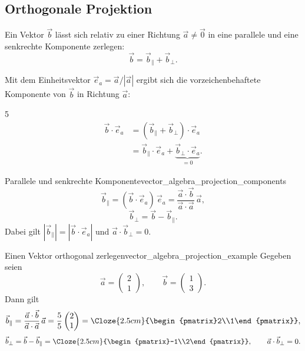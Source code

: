 \subsection{Orthogonale Projektion}
\label{subsec:vector_algebra_orthogonal_projection}

Ein Vektor $\vec b$ lässt sich relativ zu einer Richtung $\vec a\ne\vec 0$
in eine parallele und eine senkrechte Komponente zerlegen:
\[
  \boxed{\vec b=\vec b_{\parallel}+\vec b_{\perp}}.
\]

\begin{center}
\end{center}

Mit dem Einheitsvektor $\vec e_a=\vec a/|\vec a|$ ergibt sich die
vorzeichenbehaftete Komponente von $\vec b$ in Richtung $\vec a$:
\begin{ClozeArea}[34]{5}
  \[
    \begin{aligned}
      \vec b\cdot\vec e_a
      &=(\vec b_{\parallel}+\vec b_{\perp})\cdot\vec e_a\\[0.5em]
      &=\vec b_{\parallel}\cdot\vec e_a
        +\underbrace{\vec b_{\perp}\cdot\vec e_a}_{=0}.
    \end{aligned}
  \]
\end{ClozeArea}

\begin{KeyPointBox}{Parallele und senkrechte Komponente}{vector_algebra_projection_components}
  \[
    \boxed{
      \vec b_{\parallel}
      =(\vec b\cdot\vec e_a)\,\vec e_a
      =\frac{\vec a\cdot\vec b}{\vec a\cdot\vec a}\,\vec a
    },
  \]
  \[
    \boxed{
      \vec b_{\perp}
      =\vec b-\vec b_{\parallel}
    }.
  \]
  Dabei gilt $|\vec b_{\parallel}|=|\vec b\cdot\vec e_a|$ und
  $\vec a\cdot\vec b_{\perp}=0$.
\end{KeyPointBox}

\begin{ExampleBox}{Einen Vektor orthogonal zerlegen}{vector_algebra_projection_example}
  Gegeben seien
  \[
    \vec a=\begin{pmatrix}2\\1\end{pmatrix},
    \qquad
    \vec b=\begin{pmatrix}1\\3\end{pmatrix}.
  \]
  Dann gilt
  \[
    \vec b_{\parallel}
    =\frac{\vec a\cdot\vec b}{\vec a\cdot\vec a}\,\vec a
    =\frac5{5}\begin{pmatrix}2\\1\end{pmatrix}
    =\Cloze{2.5cm}{\begin{pmatrix}2\\1\end{pmatrix}},
  \]
  \[
    \vec b_{\perp}
    =\vec b-\vec b_{\parallel}
    =\Cloze{2.5cm}{\begin{pmatrix}-1\\2\end{pmatrix}},
    \qquad
    \vec a\cdot\vec b_{\perp}=0.
  \]
\end{ExampleBox}
